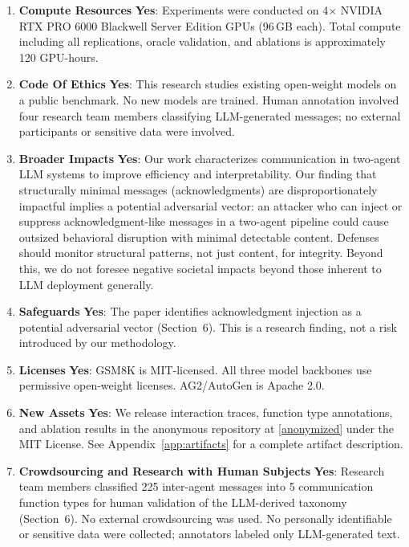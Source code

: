 \documentclass{article}
\renewcommand{\answerYes}[1]{\textbf{Yes}: #1}
\begin{document}
\begin{enumerate}
\item {\bf Compute Resources}
    \answerYes{Experiments were conducted on 4$\times$ NVIDIA RTX PRO 6000 Blackwell Server Edition GPUs (96\,GB each). Total compute including all replications, oracle validation, and ablations is approximately 120 GPU-hours.}

\item {\bf Code Of Ethics}
    \answerYes{This research studies existing open-weight models on a public benchmark. No new models are trained. Human annotation involved four research team members classifying LLM-generated messages; no external participants or sensitive data were involved.}

\item {\bf Broader Impacts}
    \answerYes{Our work characterizes communication in two-agent LLM systems to improve efficiency and interpretability. Our finding that structurally minimal messages (acknowledgments) are disproportionately impactful implies a potential adversarial vector: an attacker who can inject or suppress acknowledgment-like messages in a two-agent pipeline could cause outsized behavioral disruption with minimal detectable content. Defenses should monitor structural patterns, not just content, for integrity. Beyond this, we do not foresee negative societal impacts beyond those inherent to LLM deployment generally.}

\item {\bf Safeguards}
    \answerYes{The paper identifies acknowledgment injection as a potential adversarial vector (Section~6). This is a research finding, not a risk introduced by our methodology.}

\item {\bf Licenses}
    \answerYes{GSM8K is MIT-licensed. All three model backbones use permissive open-weight licenses. AG2/AutoGen is Apache 2.0.}

\item {\bf New Assets}
    \answerYes{We release interaction traces, function type annotations, and ablation results in the anonymous repository at \url{[anonymized]} under the MIT License. See Appendix~\ref{app:artifacts} for a complete artifact description.}

\item {\bf Crowdsourcing and Research with Human Subjects}
    \answerYes{Research team members classified 225 inter-agent messages into 5 communication function types for human validation of the LLM-derived taxonomy (Section~6). No external crowdsourcing was used. No personally identifiable or sensitive data were collected; annotators labeled only LLM-generated text.}


\end{enumerate}
\end{document}
